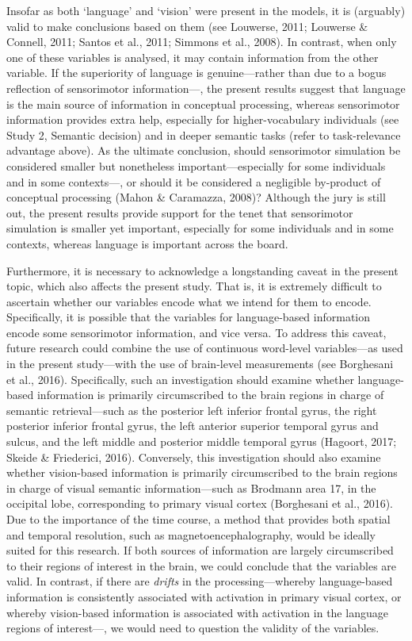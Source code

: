 \documentclass[
  12pt,
  man,floatsintext]{apa7}
\begin{document}
Insofar as both `language' and `vision' were present in the models, it is (arguably) valid to make conclusions based on them (see Louwerse, 2011; Louwerse \& Connell, 2011; Santos et al., 2011; Simmons et al., 2008). In contrast, when only one of these variables is analysed, it may contain information from the other variable. If the superiority of language is genuine---rather than due to a bogus reflection of sensorimotor information---, the present results suggest that language is the main source of information in conceptual processing, whereas sensorimotor information provides extra help, especially for higher-vocabulary individuals (see Study 2, Semantic decision) and in deeper semantic tasks (refer to task-relevance advantage above). As the ultimate conclusion, should sensorimotor simulation be considered smaller but nonetheless important---especially for some individuals and in some contexts---, or should it be considered a negligible by-product of conceptual processing (Mahon \& Caramazza, 2008)? Although the jury is still out, the present results provide support for the tenet that sensorimotor simulation is smaller yet important, especially for some individuals and in some contexts, whereas language is important across the board.

Furthermore, it is necessary to acknowledge a longstanding caveat in the present topic, which also affects the present study. That is, it is extremely difficult to ascertain whether our variables encode what we intend for them to encode. Specifically, it is possible that the variables for language-based information encode some sensorimotor information, and vice versa. To address this caveat, future research could combine the use of continuous word-level variables---as used in the present study---with the use of brain-level measurements (see Borghesani et al., 2016). Specifically, such an investigation should examine whether language-based information is primarily circumscribed to the brain regions in charge of semantic retrieval---such as the posterior left inferior frontal gyrus, the right posterior inferior frontal gyrus, the left anterior superior temporal gyrus and sulcus, and the left middle and posterior middle temporal gyrus (Hagoort, 2017; Skeide \& Friederici, 2016). Conversely, this investigation should also examine whether vision-based information is primarily circumscribed to the brain regions in charge of visual semantic information---such as Brodmann area 17, in the occipital lobe, corresponding to primary visual cortex (Borghesani et al., 2016). Due to the importance of the time course, a method that provides both spatial and temporal resolution, such as magnetoencephalography, would be ideally suited for this research. If both sources of information are largely circumscribed to their regions of interest in the brain, we could conclude that the variables are valid. In contrast, if there are \emph{drifts} in the processing---whereby language-based information is consistently associated with activation in primary visual cortex, or whereby vision-based information is associated with activation in the language regions of interest---, we would need to question the validity of the variables.
\end{document}
